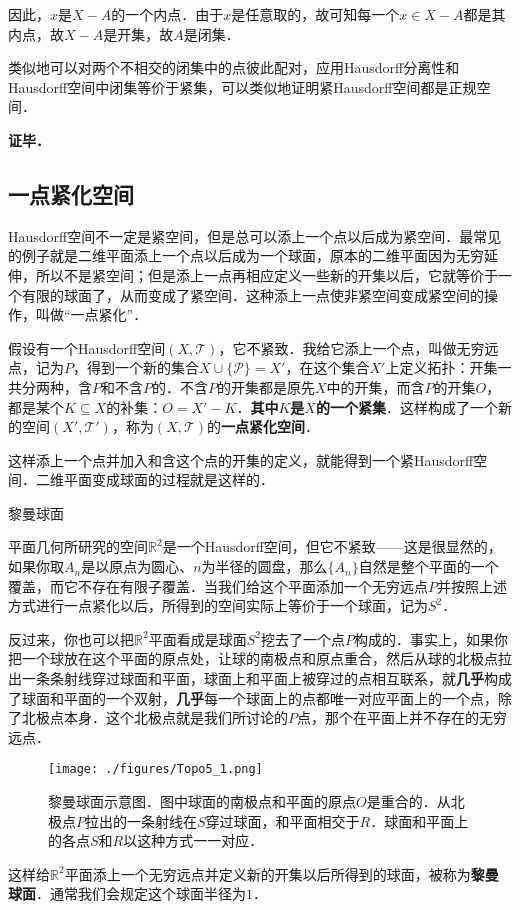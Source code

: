 因此，$x$是$X-A$的一个内点．由于$x$是任意取的，故可知每一个$x\in X-A$都是其内点，故$X-A$是开集，故$A$是闭集．

类似地可以对两个不相交的闭集中的点彼此配对，应用Hausdorff分离性和Hausdorff空间中闭集等价于紧集，可以类似地证明紧Hausdorff空间都是正规空间．


\textbf{证毕．}

\subsection{一点紧化空间}

Hausdorff空间不一定是紧空间，但是总可以添上一个点以后成为紧空间．最常见的例子就是二维平面添上一个点以后成为一个球面，原本的二维平面因为无穷延伸，所以不是紧空间；但是添上一点再相应定义一些新的开集以后，它就等价于一个有限的球面了，从而变成了紧空间．这种添上一点使非紧空间变成紧空间的操作，叫做“一点紧化”．

假设有一个Hausdorff空间$(X, \mathcal{T})$，它不紧致．我给它添上一个点，叫做无穷远点，记为$P$，得到一个新的集合$X\cup \{\mathcal{P}\}=X'$，在这个集合$X'$上定义拓扑：开集一共分两种，含$P$和不含$P$的．不含$P$的开集都是原先$X$中的开集，而含$P$的开集$O$，都是某个$K\subseteq X$的补集：$O=X'-K$．\textbf{其中$K$是$X$的一个紧集}．这样构成了一个新的空间$(X', \mathcal{T}')$，称为$(X, \mathcal{T})$的\textbf{一点紧化空间}．

这样添上一个点并加入和含这个点的开集的定义，就能得到一个紧Hausdorff空间．二维平面变成球面的过程就是这样的．

\begin{example}{黎曼球面}

平面几何所研究的空间$\mathbb{R}^2$是一个Hausdorff空间，但它不紧致——这是很显然的，如果你取$A_n$是以原点为圆心、$n$为半径的圆盘，那么$\{A_n\}$自然是整个平面的一个覆盖，而它不存在有限子覆盖．当我们给这个平面添加一个无穷远点$P$并按照上述方式进行一点紧化以后，所得到的空间实际上等价于一个球面，记为$S^2$．

反过来，你也可以把$\mathbb{R}^2$平面看成是球面$S^2$挖去了一个点$P$构成的．事实上，如果你把一个球放在这个平面的原点处，让球的南极点和原点重合，然后从球的北极点拉出一条条射线穿过球面和平面，球面上和平面上被穿过的点相互联系，就\textbf{几乎}构成了球面和平面的一个双射，\textbf{几乎}每一个球面上的点都唯一对应平面上的一个点，除了北极点本身．这个北极点就是我们所讨论的$P$点，那个在平面上并不存在的无穷远点．

\begin{figure}[ht]
\centering
\texttt{[image: ./figures/Topo5\_1.png]}
\caption{黎曼球面示意图．图中球面的南极点和平面的原点$O$是重合的．从北极点$P$拉出的一条射线在$S$穿过球面，和平面相交于$R$．球面和平面上的各点$S$和$R$以这种方式一一对应．} \label{Topo5_fig1}
\end{figure}

这样给$\mathbb{R}^2$平面添上一个无穷远点并定义新的开集以后所得到的球面，被称为\textbf{黎曼球面}．通常我们会规定这个球面半径为$1$．
\end{example}



